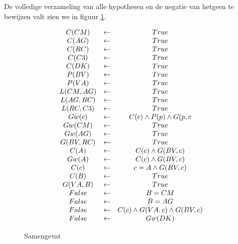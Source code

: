\documentclass[alternative-exam.tex]{subfiles}
\begin{document}
De volledige verzameling van alle hypothesen en de negatie van hetgeen te bewijzen valt zien we in figuur \ref{samengevat}.
\begin{figure}[H]
\[
\begin{array}{c c c}
C(CM) &\leftarrow& True\\
C(AG) &\leftarrow& True\\
C(RC) &\leftarrow& True\\
C(C3) &\leftarrow& True\\
C(DK) &\leftarrow& True\\
P(BV) &\leftarrow& True\\
P(VA) &\leftarrow& True\\
L(CM,AG) &\leftarrow& True\\
L(AG,RC) &\leftarrow& True\\
L(RC,C3) &\leftarrow& True\\
Gw(c) &\leftarrow& C(c) \wedge P(p) \wedge G(p,c\\
Gw(CM) &\leftarrow& True\\
Gw(AG) &\leftarrow& True\\
G(BV,RC) &\leftarrow& True\\
C(A) &\leftarrow&  C(c) \wedge  G(BV,c)\\
Gw(A) &\leftarrow&  C(c) \wedge  G(BV,c)\\
C(c) &\leftarrow& c = A \wedge G(BV,c)\\
C(B) &\leftarrow& True\\
G(VA,B) &\leftarrow& True\\
False &\leftarrow& B = CM\\
False &\leftarrow& B = AG\\
False &\leftarrow& C(c) \wedge G(VA,c) \wedge G(BV,c)\\
False &\leftarrow& Gw(DK)\\
\end{array}
\]
\caption{Samengevat}
\label{samengevat}
\end{figure}
\end{document}
